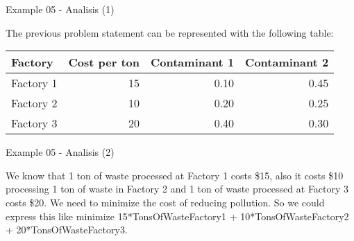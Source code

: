 \begin{frame}{Example 05 - Analisis (1)}

The previous problem statement can be represented with the following table:

\begin{center}
\begin{tabular}{lrrr}
\hline
  \cellcolor{gray90}\textbf{Factory}
& \cellcolor{gray90}\textbf{Cost per ton}
& \cellcolor{gray90}\textbf{Contaminant 1}
& \cellcolor{gray90}\textbf{Contaminant 2} \\
\hline
Factory 1 & 15 & 0.10 & 0.45 \\
Factory 2 & 10 & 0.20 & 0.25 \\
Factory 3 & 20 & 0.40 & 0.30 \\
\hline
\end{tabular}
\end{center}

\end{frame}

\begin{frame}{Example 05 - Analisis (2)}

We know that 1 ton of waste processed at Factory 1 costs \$15, also it
costs \$10 processing 1 ton of waste in Factory 2 and 1 ton of waste
processed at Factory 3 costs \$20. We need to minimize the cost of
reducing pollution.  So we could express this like minimize
15*TonsOfWasteFactory1 + 10*TonsOfWasteFactory2 + 20*TonsOfWasteFactory3.
\end{frame}
